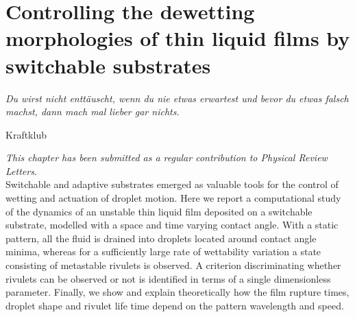 \chapter{Controlling the dewetting morphologies of thin liquid films by switchable substrates}
\label{chapter:third_paper}
\epigraph{\textit{Du wirst nicht enttäuscht, wenn du nie etwas erwartest und bevor du etwas falsch machst, dann mach mal lieber gar nichts.}}{Kraftklub}

\textit{\small{This chapter has been submitted as a regular contribution to Physical Review Letters.}}\\

Switchable and adaptive substrates emerged as valuable tools for the control of wetting and actuation of droplet motion. Here we report a computational study of the dynamics of an unstable thin liquid film deposited on a switchable substrate, modelled with a space and time varying contact angle.
With a static pattern, all the fluid is drained into droplets located around contact angle minima, whereas for a sufficiently large rate of wettability variation a state consisting of metastable rivulets is observed. 
A criterion discriminating whether rivulets can be observed or not is identified in terms of a single dimensionless parameter.
Finally, we show and explain theoretically how the film rupture times, droplet shape and rivulet life time depend on the pattern wavelength and speed.
\\
\newcommand{\ts}{\textsuperscript}

